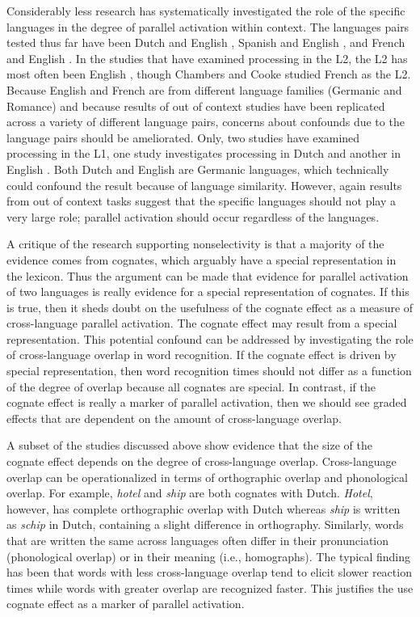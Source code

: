 Considerably less research has systematically investigated the role of the specific languages in the degree of parallel activation within context. The languages pairs tested thus far have been Dutch and English \parencite[][]{Baten2010,Duyck2007, VanAssche2009, VanAssche2010}, Spanish and English \parencite[][]{Schwartz2006}, and French and English \parencite[][]{Chambers2009,Libben2009}. In the studies that have examined processing in the L2, the L2 has most often been English \parencite[][]{Baten2010,Duyck2007, Libben2009, VanAssche2010}, though Chambers and Cooke studied French as the L2. Because English and French are from different language families (Germanic and Romance) and because results of out of context studies have been replicated across a variety of different language pairs, concerns about confounds due to the language pairs should be ameliorated. Only, two studies have examined processing in the L1, one study investigates processing in Dutch \parencite[][]{VanAssche2009} and another in English \parencite{Schwartz2006}. Both Dutch and English are Germanic languages, which technically could confound the result because of language similarity. However, again results from out of context tasks suggest that the specific languages should not play a very large role; parallel activation should occur regardless of the languages.

A critique of the research supporting nonselectivity is that a majority of the evidence comes from cognates, which arguably have a special representation in the lexicon. Thus the argument can be made that evidence for parallel activation of two languages is really evidence for a special representation of cognates. If this is true, then it sheds doubt on the usefulness of the cognate effect as a measure of cross-language parallel activation. The cognate effect may result from a special representation. This potential confound can be addressed by investigating the role of cross-language overlap in word recognition. If the cognate effect is driven by special representation, then word recognition times should not differ as a function of the degree of overlap because all cognates are special. In contrast, if the cognate effect is really a marker of parallel activation, then we should see graded effects that are dependent on the amount of cross-language overlap.  

A subset of the studies discussed above show evidence that the size of the cognate effect  depends on the degree of cross-language overlap. Cross-language overlap can be operationalized in terms of orthographic overlap and phonological overlap. For example, \textit{hotel} and \textit{ship} are both cognates with Dutch. \textit{Hotel}, however, has complete orthographic overlap with Dutch whereas \textit{ship} is written as \textit{schip} in Dutch, containing a slight difference in orthography. Similarly, words that are written the same across languages often differ in their pronunciation (phonological overlap) or in their meaning (i.e., homographs). The typical finding has been that words with less cross-language overlap tend to elicit slower reaction times while words with greater overlap are recognized faster. This justifies the use cognate effect as a marker of parallel activation. 

